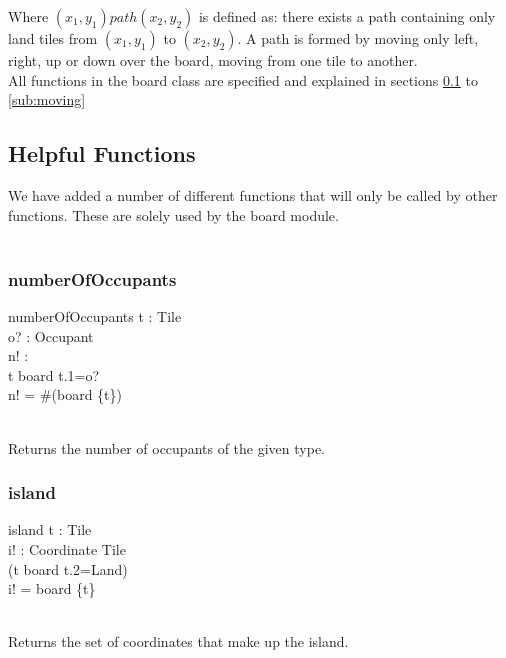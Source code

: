 \documentclass[a4paper,twoside,11pt]{book}
\begin{document}
Where $(x_1,y_1)path(x_2,y_2)$ is defined as: there exists a path containing only land tiles from $(x_1,y_1)$ to $(x_2,y_2)$. A path is formed by moving only left, right, up or down over the board, moving from one tile to another. \\ %

All functions in the board class are specified and explained in sections \ref{sub:helpful_functions} to \ref{sub:moving}


\subsection{Helpful Functions} %
\label{sub:helpful_functions}

We have added a number of different functions that will only be called by other functions. These are solely used by the board module. \\ \\

\subsubsection{numberOfOccupants} %
\label{ssub:numberofoccupants}
\begin{schema}{numberOfOccupants}
    t : Tile \\
    o? : Occupant \\
    n! :  \\
    \ST
    t \in \ran board \wedge t.1=o? \\
    n! = \#(board \triangleright \{t\}) \\
\end{schema}\\
 Returns the number of occupants of the given type. \\


\subsubsection{island} %
\label{ssub:island}
\begin{schema}{island}
    t : Tile \\
    i! : Coordinate \ffun Tile  \\
    \ST
    (t \in \ran board \wedge t.2=Land) \\
    i! = board \triangleright \{t\} \\
\end{schema}\\
Returns the set of coordinates that make up the island. \\
\end{document}
